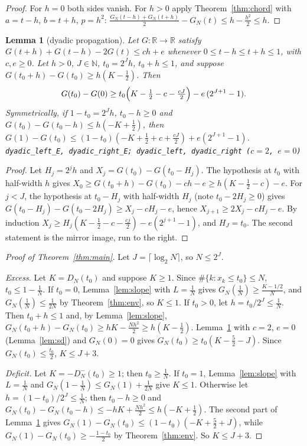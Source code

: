 \documentclass[11pt]{amsart}
\newtheorem{lemma}[theorem]{Lemma}
\theoremstyle{remark}
\newcommand{\lean}[1]{\texttt{\small #1}}
\newcommand{\clog}{\lceil\log_2N\rceil}
\begin{document}
\begin{proof}
For $h=0$ both sides vanish. For $h>0$ apply Theorem~\ref{thm:chord} with $a=t-h$,
$b=t+h$, $p=h^2$:
$\frac{G_N(t-h)+G_N(t+h)}2-G_N(t)\le h-\frac{h^2}2\le h$.
\end{proof}

\begin{lemma}[dyadic propagation]\label{lem:dyadic}
Let $G:\mathbb R\to\mathbb R$ satisfy
$G(t+h)+G(t-h)-2G(t)\le ch+e$ whenever $0\le t-h\le t+h\le1$, with $c,e\ge0$.
Let $h>0$, $J\in\mathbb N$, $t_0=2^Jh$, $t_0+h\le1$, and suppose
$G(t_0+h)-G(t_0)\ge h(K-\frac12)$. Then
\[
G(t_0)-G(0)\ge t_0\Bigl(K-\tfrac12-c-\tfrac{cJ}2\Bigr)-e\,(2^{J+1}-1).
\]
Symmetrically, if $1-t_0=2^Jh$, $t_0-h\ge0$ and $G(t_0)-G(t_0-h)\le h(-K+\frac12)$,
then $G(1)-G(t_0)\le(1-t_0)(-K+\frac12+c+\frac{cJ}2)+e(2^{J+1}-1)$.
\lean{dyadic\_left\_E, dyadic\_right\_E; dyadic\_left, dyadic\_right ($c=2$, $e=0$)}
\end{lemma}

\begin{proof}
Let $H_j=2^jh$ and $X_j=G(t_0)-G(t_0-H_j)$. The hypothesis at $t_0$ with
half-width $h$ gives $X_0\ge G(t_0+h)-G(t_0)-ch-e\ge h(K-\frac12-c)-e$. For
$j<J$, the hypothesis at $t_0-H_j$ with half-width $H_j$ (note
$t_0-2H_j\ge0$) gives $G(t_0-H_j)-G(t_0-2H_j)\ge X_j-cH_j-e$, hence
$X_{j+1}\ge2X_j-cH_j-e$. By induction
$X_j\ge H_j(K-\frac12-c-\frac{cj}2)-e(2^{j+1}-1)$, and $H_J=t_0$. The second
statement is the mirror image, run to the right.
\end{proof}

\begin{proof}[Proof of Theorem~\ref{thm:main}]
Let $J=\clog$, so $N\le2^J$.

\emph{Excess.} Let $K=D_N(t_0)$ and suppose $K\ge1$. Since
$\#\{k:x_k\le t_0\}\le N$, $t_0\le1-\frac1N$. If $t_0=0$, Lemma~\ref{lem:slope}
with $L=\frac1N$ gives $G_N(\frac1N)\ge\frac{K-1/2}N$, and
$G_N(\frac1N)\le\frac1{2N}$ by Theorem~\ref{thm:env}, so $K\le1$. If $t_0>0$, let
$h=t_0/2^J\le\frac1N$. Then $t_0+h\le1$ and, by Lemma~\ref{lem:slope},
$G_N(t_0+h)-G_N(t_0)\ge hK-\frac{Nh^2}2\ge h(K-\frac12)$. Lemma~\ref{lem:dyadic}
with $c=2$, $e=0$ (Lemma~\ref{lem:sd}) and $G_N(0)=0$ gives
$G_N(t_0)\ge t_0(K-\frac52-J)$. Since $G_N(t_0)\le\frac{t_0}2$, $K\le J+3$.

\emph{Deficit.} Let $K=-D_N^-(t_0)\ge1$; then $t_0\ge\frac1N$. If $t_0=1$,
Lemma~\ref{lem:slope} with $L=\frac1N$ and
$G_N(1-\frac1N)\le G_N(1)+\frac1{2N}$ give $K\le1$. Otherwise let
$h=(1-t_0)/2^J\le\frac1N$; then $t_0-h\ge0$ and
$G_N(t_0)-G_N(t_0-h)\le-hK+\frac{Nh^2}2\le h(-K+\frac12)$. The second part of
Lemma~\ref{lem:dyadic} gives $G_N(1)-G_N(t_0)\le(1-t_0)(-K+\frac52+J)$, while
$G_N(1)-G_N(t_0)\ge-\frac{1-t_0}2$ by Theorem~\ref{thm:env}. So $K\le J+3$.
\end{proof}
\end{document}
